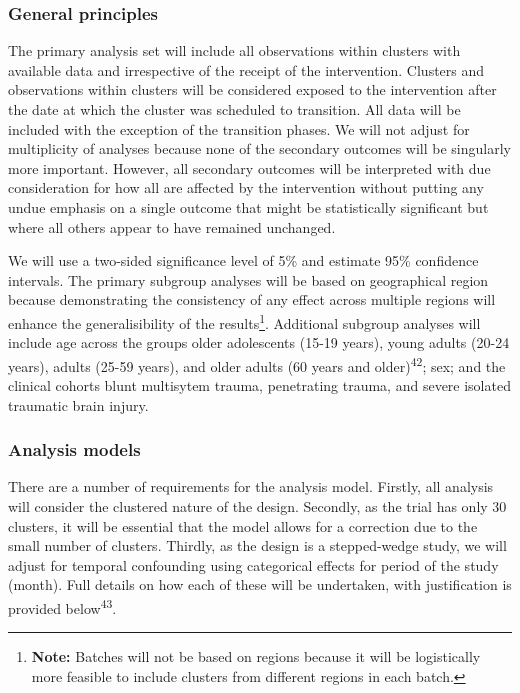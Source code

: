 \documentclass[
]{scrartcl}
\begin{document}
\subsubsection{General principles}\label{general-principles}

The primary analysis set will include all observations within clusters
with available data and irrespective of the receipt of the intervention.
Clusters and observations within clusters will be considered exposed to
the intervention after the date at which the cluster was scheduled to
transition. All data will be included with the exception of the
transition phases. We will not adjust for multiplicity of analyses
because none of the secondary outcomes will be singularly more
important. However, all secondary outcomes will be interpreted with due
consideration for how all are affected by the intervention without
putting any undue emphasis on a single outcome that might be
statistically significant but where all others appear to have remained
unchanged.

We will use a two-sided significance level of 5\% and estimate 95\%
confidence intervals. The primary subgroup analyses will be based on
geographical region because demonstrating the consistency of any effect
across multiple regions will enhance the generalisibility of the
results\footnote{\textbf{Note:} Batches will not be based on regions
  because it will be logistically more feasible to include clusters from
  different regions in each batch.}. Additional subgroup analyses will
include age across the groups older adolescents (15-19 years), young
adults (20-24 years), adults (25-59 years), and older adults (60 years
and older)\textsuperscript{42}; sex; and the clinical cohorts blunt
multisytem trauma, penetrating trauma, and severe isolated traumatic
brain injury.

\subsubsection{Analysis models}\label{analysis-models}

There are a number of requirements for the analysis model. Firstly, all
analysis will consider the clustered nature of the design. Secondly, as
the trial has only 30 clusters, it will be essential that the model
allows for a correction due to the small number of clusters. Thirdly, as
the design is a stepped-wedge study, we will adjust for temporal
confounding using categorical effects for period of the study (month).
Full details on how each of these will be undertaken, with justification
is provided below\textsuperscript{43}.
\end{document}

